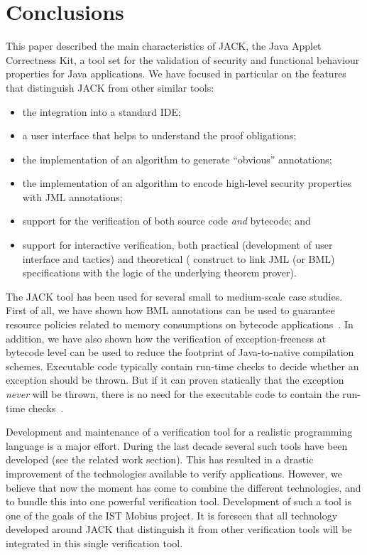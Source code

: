 
\section{Conclusions}\label{SecConcl}

This paper described the main characteristics of JACK, the Java Applet
Correctness Kit, a tool set for the validation of security and
functional behaviour properties for Java applications. We have focused
in particular on the features that distinguish JACK from other similar
tools:
\begin{itemize}
\item the integration into a standard IDE;
\item a user interface that helps to understand the proof obligations;
\item the implementation of an algorithm to generate
``obvious'' annotations;
\item the implementation of an algorithm to encode high-level security
properties with JML annotations; 
\item support for the verification of both source code \emph{and}
bytecode; and
\item support for interactive verification, both practical
(development of user interface and tactics) and theoretical (\native
construct to link JML (or BML) specifications with the logic of the
underlying theorem prover).
\end{itemize}

The JACK tool has been used for several small to medium-scale case
studies. First of all, we have shown how BML annotations can be used
to guarantee resource policies related to memory consumptions on
bytecode applications~\cite{BarthePS05}. In addition, we have also
shown how the verification of exception-freeness at bytecode level can
be used to reduce the footprint of Java-to-native compilation
schemes. Executable code typically contain run-time checks to decide
whether an exception should be thrown. But if it can proven statically
that the exception \emph{never} will be thrown, there is no need for
the executable code to contain the run-time
checks~\cite{DBLP:conf/cardis/CourbotPGV06}.


Development and maintenance of a verification tool for a realistic
programming language is a major effort. During the last decade several
such tools have been developed (see the related work section). This
has resulted in a drastic improvement of the technologies available to
verify applications. However, we believe that now the moment has come
to combine the different technologies, and to bundle this into one
powerful verification tool. Development of such a tool is one of the
goals of the IST \textsf{Mobius} project. It is foreseen that all technology
developed around JACK that distinguish it from other verification
tools will be integrated in this single verification tool. 

